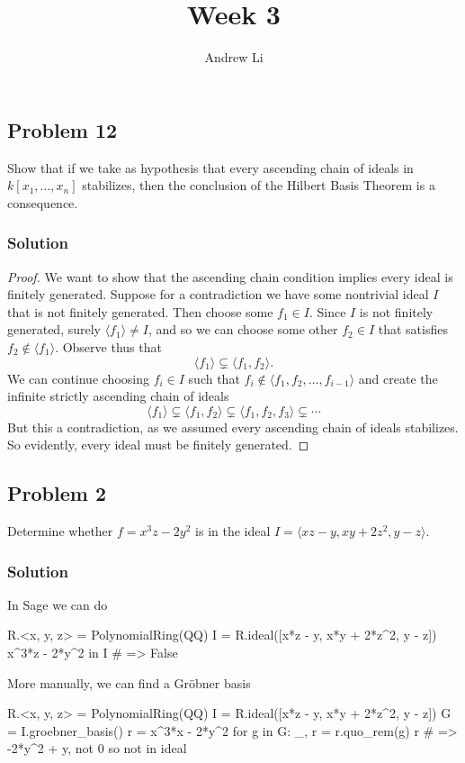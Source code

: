 \documentclass{homework}
\title{Week 3}
\author{Andrew Li}
\begin{document}
    \maketitle
    
    \setcounter{section}{2}
    \setcounter{subsection}{4}
    \subsection{Problem 12}
    
    Show that if we take as hypothesis that every ascending chain of ideals in $k[x_1, \dots, x_n]$ stabilizes, then the conclusion of the Hilbert Basis Theorem is a consequence.
    
    \subsubsection{Solution}
    \begin{proof}
        We want to show that the ascending chain condition implies every ideal is finitely generated. Suppose for a contradiction we have some nontrivial ideal $I$ that is not finitely generated. Then choose some $f_1 \in I$. Since $I$ is not finitely generated, surely $\langle f_1 \rangle \neq I$, and so we can choose some other $f_2 \in I$ that satisfies $f_2 \not\in \langle f_1 \rangle$. Observe thus that
        \[\langle f_1 \rangle \subsetneq \langle f_1, f_2 \rangle.\]
        We can continue choosing $f_i \in I$ such that $f_i \not\in \langle f_1, f_2, \dots, f_{i-1} \rangle$ and create the infinite strictly ascending chain of ideals
        \[\langle f_1 \rangle \subsetneq \langle f_1, f_2 \rangle \subsetneq \langle f_1, f_2, f_3 \rangle \subsetneq \cdots\]
        But this a contradiction, as we assumed every ascending chain of ideals stabilizes. So evidently, every ideal must be finitely generated.
    \end{proof}
    
    \setcounter{subsection}{7}
    \subsection{Problem 2}
    Determine whether $f = x^3z - 2y^2$ is in the ideal $I = \langle xz - y, xy + 2z^2, y - z \rangle$.
    
    \subsubsection{Solution}
    In Sage we can do
    \begin{python}
R.<x, y, z> = PolynomialRing(QQ)
I = R.ideal([x*z - y, x*y + 2*z^2, y - z])
x^3*z - 2*y^2 in I # => False
    \end{python}
    More manually, we can find a Gr\"obner basis 
    \begin{python}
R.<x, y, z> = PolynomialRing(QQ)
I = R.ideal([x*z - y, x*y + 2*z^2, y - z])
G = I.groebner_basis()
r = x^3*x - 2*y^2
for g in G:
    _, r = r.quo_rem(g)
r # => -2*y^2 + y, not 0 so not in ideal
    \end{python}
\end{document}
